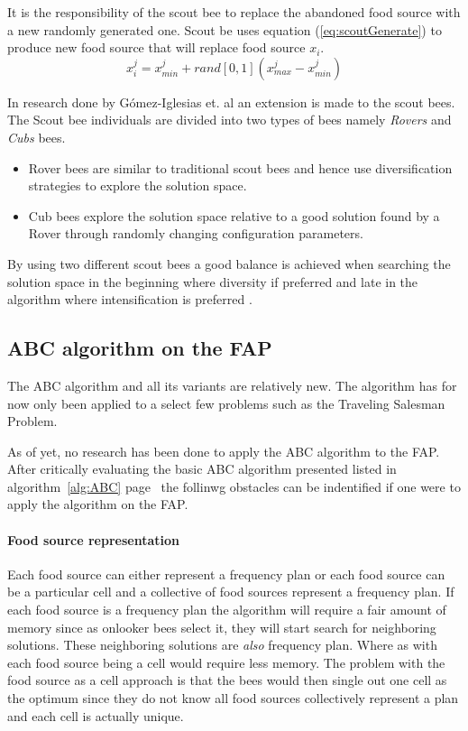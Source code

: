 It is the responsibility of the scout bee to replace the abandoned food source with a new randomly generated one. Scout be uses equation (\ref{eq:scoutGenerate}) to produce new food source that will replace food source $x_i$.
\begin{equation}
\label{eq:scoutGenerate}
x^j_i = x^j_{min} + rand[0,1](x^j_{max} - x^j_{min})
\end{equation}

In research done by G\'{o}mez-Iglesias et. al \cite{ABCFusionGrid} an extension is made to the scout bees. The Scout bee individuals are divided into two types of bees namely \emph{Rovers} and \emph{Cubs} bees\cite{ABCFusionGrid}.
\begin{itemize}
\item{Rover bees} are similar to traditional scout bees and hence use diversification strategies to explore the solution space. 
\item {Cub bees} explore the solution space relative to a good solution found by a Rover through randomly changing configuration parameters. 
\end{itemize}
By using two different scout bees a good balance is achieved when searching the solution space in the beginning where diversity if preferred and late in the algorithm where intensification is preferred \cite{ABCFusionGrid}.
\subsection{ABC algorithm on the FAP}
The ABC algorithm and all its variants are relatively new. The algorithm has for now only been applied to a select few problems such as the Traveling Salesman Problem.

As of yet, no research has been done to apply the ABC algorithm to the FAP. After critically evaluating the basic ABC algorithm presented listed in algorithm~\ref{alg:ABC} page~\pageref{alg:ABC} the follinwg obstacles can be indentified if one were to apply the algorithm on the FAP.
\paragraph{Food source representation}
Each food source can either represent a frequency plan or each food source can be a particular cell and a collective of food sources represent a frequency plan. If each food source is a frequency plan the algorithm will require a fair amount of memory since as onlooker bees select it, they will start search for neighboring solutions. These neighboring solutions are \emph{also} frequency plan. Where as with each food source being a cell would require less memory. The problem with the food source as a cell approach is that the bees would then single out one cell as the optimum since they do not know all food sources collectively represent a plan and each cell is actually unique.
